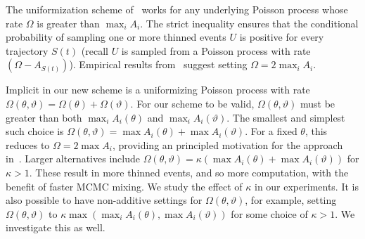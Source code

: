 The uniformization scheme of~\cite{RaoTeh13} works for any underlying Poisson
process whose rate $\Omega$ is greater than $\max_i A_i$. The strict inequality
ensures that the conditional probability of sampling one or more thinned events 
$U$ is positive for every trajectory $S(t)$ (recall $U$ is sampled from a Poisson process with rate $(\Omega-A_{S(t)})$). Empirical results from~\cite{RaoTeh13}
suggest setting $\Omega = 2 \max_i A_i$.

Implicit in our new scheme is a uniformizing Poisson process with rate
$\Omega(\theta,\vartheta) = \Omega(\theta) + \Omega(\vartheta)$. For our 
scheme to be valid, $\Omega(\theta,\vartheta)$ must be greater than both
$\max_i A_i(\theta)$ and $\max_i A_i(\vartheta)$. The smallest and simplest such
choice is $\Omega(\theta,\vartheta) = \max A_i(\theta) + \max A_i(\vartheta)$.
For a fixed $\theta$, this reduces to $\Omega = 2\max A_i$, providing
an principled motivation for the approach in~\cite{RaoTeh13}.
Larger alternatives include 
$\Omega(\theta,\vartheta) = \kappa(\max A_i(\theta) + \max A_i(\vartheta))$
for $\kappa > 1$.  These result in more thinned events, and so more 
computation, with the benefit of faster MCMC mixing. We study the effect of 
$\kappa$ in our experiments.
It is also possible to have non-additive settings for $\Omega(\theta,\vartheta)$,
for example, setting $\Omega(\theta,\vartheta)$ to 
$\kappa \max( \max_i A_i(\theta), \max A_i(\vartheta))$ for some choice of $\kappa
> 1$. We investigate this as well.

